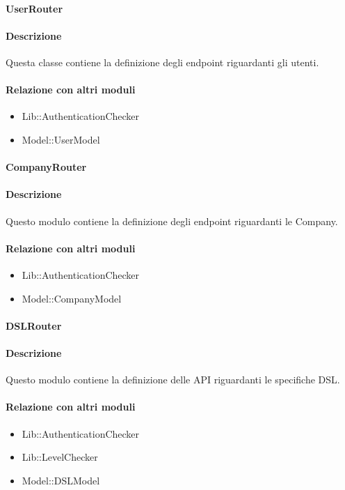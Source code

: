 \paragraph{UserRouter}
\paragraph*{Descrizione}
Questa classe contiene la definizione degli endpoint riguardanti gli utenti. 

\paragraph*{Relazione con altri moduli}
\begin{itemize}
\item Lib::AuthenticationChecker
\item Model::UserModel
\end{itemize}

\paragraph{CompanyRouter}
\paragraph*{Descrizione}
Questo modulo contiene la definizione degli endpoint riguardanti le Company.

\paragraph*{Relazione con altri moduli}
\begin{itemize}
\item Lib::AuthenticationChecker
\item Model::CompanyModel
\end{itemize}

\paragraph{DSLRouter}
\paragraph*{Descrizione}
Questo modulo contiene la definizione delle API riguardanti le specifiche DSL.

\paragraph*{Relazione con altri moduli}
\begin{itemize}
\item Lib::AuthenticationChecker
\item Lib::LevelChecker
\item Model::DSLModel
\end{itemize}

